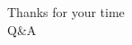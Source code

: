 \documentclass[
	11pt, %
]{beamer}
\begin{document}
\begin{frame}[plain]
\begin{center}{\Huge Thanks for your time}\\
\bigskip
\bigskip %
{\LARGE Q\&A}
\end{center}
\end{frame}
\end{document}
